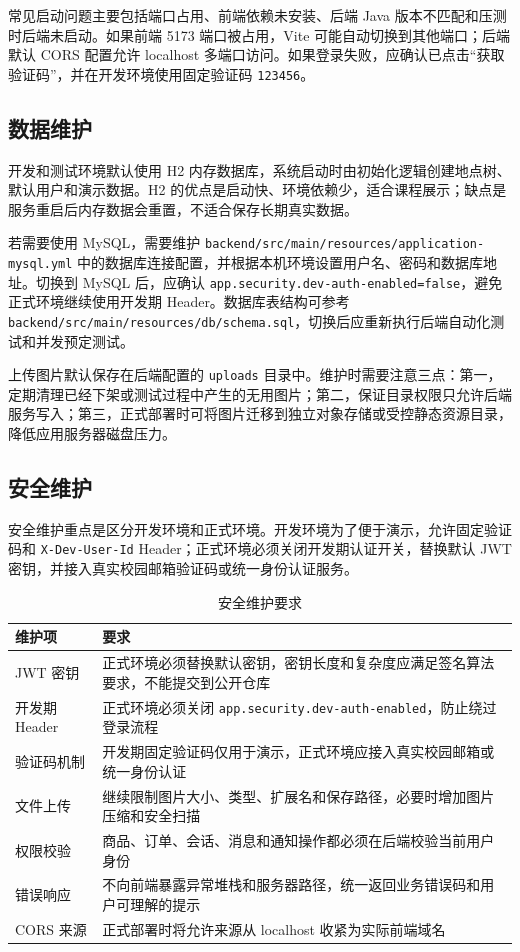 ﻿\documentclass[UTF8,a4paper,12pt]{ctexart}
\begin{document}
常见启动问题主要包括端口占用、前端依赖未安装、后端 Java 版本不匹配和压测时后端未启动。如果前端 5173 端口被占用，Vite 可能自动切换到其他端口；后端默认 CORS 配置允许 localhost 多端口访问。如果登录失败，应确认已点击“获取验证码”，并在开发环境使用固定验证码 \texttt{123456}。

\subsection{数据维护}
开发和测试环境默认使用 H2 内存数据库，系统启动时由初始化逻辑创建地点树、默认用户和演示数据。H2 的优点是启动快、环境依赖少，适合课程展示；缺点是服务重启后内存数据会重置，不适合保存长期真实数据。

若需要使用 MySQL，需要维护 \texttt{backend/src/main/resources/application-mysql.yml} 中的数据库连接配置，并根据本机环境设置用户名、密码和数据库地址。切换到 MySQL 后，应确认 \texttt{app.security.dev-auth-enabled=false}，避免正式环境继续使用开发期 Header。数据库表结构可参考 \texttt{backend/src/main/resources/db/schema.sql}，切换后应重新执行后端自动化测试和并发预定测试。

上传图片默认保存在后端配置的 \texttt{uploads} 目录中。维护时需要注意三点：第一，定期清理已经下架或测试过程中产生的无用图片；第二，保证目录权限只允许后端服务写入；第三，正式部署时可将图片迁移到独立对象存储或受控静态资源目录，降低应用服务器磁盘压力。

\subsection{安全维护}
安全维护重点是区分开发环境和正式环境。开发环境为了便于演示，允许固定验证码和 \texttt{X-Dev-User-Id} Header；正式环境必须关闭开发期认证开关，替换默认 JWT 密钥，并接入真实校园邮箱验证码或统一身份认证服务。

\begin{table}[H]
  \centering
  \caption{安全维护要求}
  \begin{tabular}{p{3.2cm}p{9.4cm}}
    \toprule
    维护项 & 要求 \\
    \midrule
    JWT 密钥 & 正式环境必须替换默认密钥，密钥长度和复杂度应满足签名算法要求，不能提交到公开仓库 \\
    开发期 Header & 正式环境必须关闭 \texttt{app.security.dev-auth-enabled}，防止绕过登录流程 \\
    验证码机制 & 开发期固定验证码仅用于演示，正式环境应接入真实校园邮箱或统一身份认证 \\
    文件上传 & 继续限制图片大小、类型、扩展名和保存路径，必要时增加图片压缩和安全扫描 \\
    权限校验 & 商品、订单、会话、消息和通知操作都必须在后端校验当前用户身份 \\
    错误响应 & 不向前端暴露异常堆栈和服务器路径，统一返回业务错误码和用户可理解的提示 \\
    CORS 来源 & 正式部署时将允许来源从 localhost 收紧为实际前端域名 \\
    \bottomrule
  \end{tabular}
\end{table}
\end{document}
